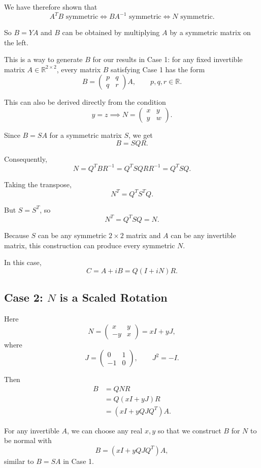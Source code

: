 \documentclass[11pt, reqno, a4paper]{amsart}
\theoremstyle{plain}
\theoremstyle{definition}
\theoremstyle{remark}
\numberwithin{equation}{section}
\begin{document}
We have therefore shown that
\[
A^TB\text{ symmetric}
\iff
BA^{-1}\text{ symmetric}
\iff
N\text{ symmetric}.
\]

So $B=YA$ and $B$ can be obtained by multiplying $A$ by a symmetric matrix on the left.

This is a way to generate $B$ for our results in Case 1: for any fixed invertible matrix $A\in\mathbb{R}^{2\times2}$, every matrix $B$ satisfying Case 1 has the form
\[
B=
\begin{pmatrix}
p&q\\
q&r
\end{pmatrix}A,
\qquad p,q,r\in\mathbb{R}.
\]

This can also be derived directly from the condition
\[
y=z
\implies
N=
\begin{pmatrix}
x&y\\
y&w
\end{pmatrix}.
\]

Since $B=SA$ for a symmetric matrix $S$, we get
\[
B=SQR.
\]

Consequently,
\[
N=Q^TBR^{-1}=Q^TSQRR^{-1}=Q^TSQ.
\]

Taking the transpose,
\[
N^T=Q^TS^TQ.
\]

But $S=S^T$, so
\[
N^T=Q^TSQ=N.
\]

Because $S$ can be any symmetric $2\times2$ matrix and $A$ can be any invertible matrix, this construction can produce every symmetric $N$.

In this case,
\[
C=A+iB=Q(I+iN)R.
\]

\subsection{Case 2: $N$ is a Scaled Rotation}

Here
\[
N=
\begin{pmatrix}
x&y\\
-y&x
\end{pmatrix}
=xI+yJ,
\]
where
\[
J=
\begin{pmatrix}
0&1\\
-1&0
\end{pmatrix},
\qquad J^2=-I.
\]

Then
\begin{align*}
B
&=QNR\\
&=Q(xI+yJ)R\\
&=(xI+yQJQ^T)A.
\end{align*}

For any invertible $A$, we can choose any real $x,y$ so that we construct $B$ for $N$ to be normal with
\[
B=(xI+yQJQ^T)A,
\]
similar to $B=SA$ in Case 1.
\end{document}
